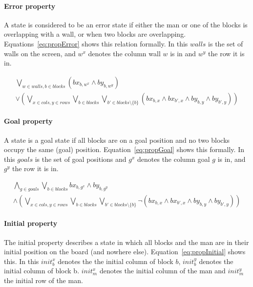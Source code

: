 \paragraph{Error property} A state is considered to be an error state if either
the man or one of the blocks is overlapping with a wall, or when two blocks are
overlapping. Equations~\ref{eq:propError} shows this relation formally. In this
$walls$ is the set of walls on the screen, and $w^x$ denotes the column
wall $w$ is in and $w^y$ the row it is in.

\begin{multline}\label{eq:propError}
	\bigvee_{w \in walls, b \in blocks} (bx_{b,w^x} \wedge by_{b,w^y})\\  
	\vee \left( \bigvee_{x \in cols, y \in rows} \bigvee_{b \in blocks}
				\bigvee_{b' \in blocks \setminus \{b\}} 
					(bx_{b,x} \wedge bx_{b',x} \wedge by_{b,y} \wedge by_{b',y})
		\right)
\end{multline}

\paragraph{Goal property} A state is a goal state if all blocks are on a goal
position and no two blocks occupy the same (goal) position. 
Equation~\ref{eq:propGoal} shows this formally. In this $goals$ is the set of
goal positions and $g^x$ denotes the column goal $g$ is in, and $g^y$ the row
it is in.

\begin{multline}\label{eq:propGoal}
	\bigwedge_{g \in goals} \bigvee_{b \in blocks} 
		bx_{b,g^x} \wedge by_{b,g^y}\\  
	\wedge \left( \bigvee_{x \in cols, y \in rows} \bigvee_{b \in blocks}
				\bigvee_{b' \in blocks \setminus \{b\}} 
				\neg(bx_{b,x} \wedge bx_{b',x} \wedge by_{b,y} \wedge by_{b',y})
		\right)
\end{multline}

\paragraph{Initial property} The initial property describes a state in which all
blocks and the man are in their initial position on the board (and nowhere 
else). Equation~\ref{eq:propInitial} shows this. In this $init_b^x$ denotes
the the initial column of block $b$, $init_b^y$ denotes the initial column of
block b. $init_m^x$ denotes the initial column of the man and $init_m^y$ the 
initial row of the man.

